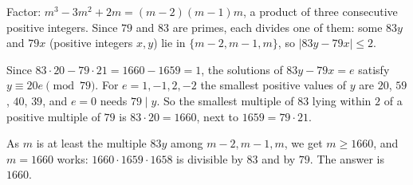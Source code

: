 Factor: $m^3-3m^2+2m=(m-2)(m-1)m$, a product of three consecutive positive integers. Since $79$ and $83$ are primes, each divides one of them: some $83y$ and $79x$ (positive integers $x,y$) lie in $\{m-2,m-1,m\}$, so $|83y-79x|\le2$.

Since $83\cdot20-79\cdot21=1660-1659=1$, the solutions of $83y-79x=e$ satisfy $y\equiv20e\pmod{79}$. For $e=1,-1,2,-2$ the smallest positive values of $y$ are $20$, $59$, $40$, $39$, and $e=0$ needs $79\mid y$. So the smallest multiple of $83$ lying within $2$ of a positive multiple of $79$ is $83\cdot20=1660$, next to $1659=79\cdot21$.

As $m$ is at least the multiple $83y$ among $m-2,m-1,m$, we get $m\ge1660$, and $m=1660$ works: $1660\cdot1659\cdot1658$ is divisible by $83$ and by $79$. The answer is $\boxed{1660}$.
